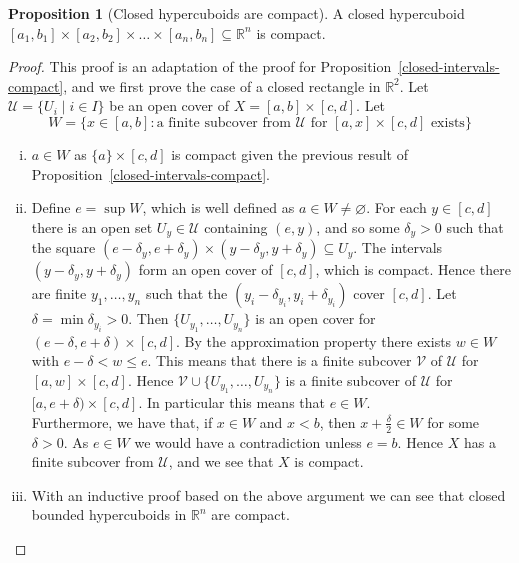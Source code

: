 \documentclass[10pt,fleqn]{article}
\newcommand{\reals}{\mathbb{R}}
\theoremstyle{definition} \newtheorem{defn}{Definition}[section]
\theoremstyle{plain}      \newtheorem{thm}[defn]{Theorem}
\theoremstyle{definition} \newtheorem{prop}[defn]{Proposition}
\theoremstyle{definition} \newtheorem{cor}[defn]{Corollary}
\theoremstyle{definition} \newtheorem{ex}[defn]{Example}
\theoremstyle{definition} \newtheorem{rem}[defn]{Remark}
\begin{document}
\begin{prop}[Closed hypercuboids are compact]
    A closed hypercuboid $[a_1,b_1]\times[a_2,b_2]\times\ldots\times[a_n,b_n]\subseteq\reals^n$ is compact.
\end{prop}

\begin{proof}
    This proof is an adaptation of the proof for Proposition~\ref{closed-intervals-compact}, and we first prove the case of a closed rectangle in $\reals^2$.
    Let $\mathcal{U}=\{U_i\mid i\in I\}$ be an open cover of $X=[a,b]\times[c,d]$.
    Let
    \[
        W=\{x\in[a,b]\colon\text{a finite subcover from }\mathcal{U}\text{ for }[a,x]\times[c,d]\text{ exists}\}
    \]
    \begin{enumerate}[(i)]
        \item $a\in W$ as $\{a\}\times[c,d]$ is compact given the previous result of Proposition~\ref{closed-intervals-compact}.
        \item Define $e=\sup W$, which is well defined as $a\in W\neq\varnothing$.
        For each $y\in[c,d]$ there is an open set $U_y\in\mathcal{U}$ containing $(e,y)$, and so some $\delta_y>0$ such that the square $(e-\delta_y,e+\delta_y)\times(y-\delta_y,y+\delta_y)\subseteq U_y$.
        The intervals $(y-\delta_y,y+\delta_y)$ form an open cover of $[c,d]$, which is compact.
        Hence there are finite $y_1,\ldots,y_n$ such that the $(y_i-\delta_{y_i},y_i+\delta_{y_i})$ cover $[c,d]$.
        Let $\delta=\min\delta_{y_i}>0$.
        Then $\{U_{y_1},\ldots,U_{y_n}\}$ is an open cover for $(e-\delta,e+\delta)\times[c,d]$.
        By the approximation property there exists $w\in W$ with $e-\delta<w\leq e$.
        This means that there is a finite subcover $\mathcal{V}$ of $\mathcal{U}$ for $[a,w]\times[c,d]$.
        Hence $\mathcal{V}\cup\{U_{y_1},\ldots,U_{y_n}\}$ is a finite subcover of $\mathcal{U}$ for $[a,e+\delta)\times[c,d]$.
        In particular this means that $e\in W$.\\
        Furthermore, we have that, if $x\in W$ and $x<b$, then $x+\frac{\delta}{2}\in W$ for some $\delta>0$.
        As $e\in W$ we would have a contradiction unless $e=b$.
        Hence $X$ has a finite subcover from $\mathcal{U}$, and we see that $X$ is compact.
        \item With an inductive proof based on the above argument we can see that closed bounded hypercuboids in $\reals^n$ are compact.
    \end{enumerate}
\end{proof}
\end{document}
